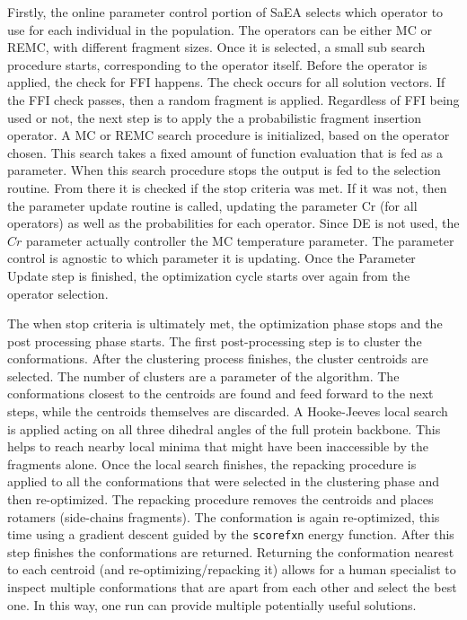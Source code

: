Firstly, the online parameter control portion of \ac{SaEA} selects which
operator to use for each individual in the population.
%
The operators can be either \ac{MC} or \ac{REMC}, with different fragment sizes.
Once it is selected, a small sub search procedure starts, corresponding to the
operator itself.
%
Before the operator is applied, the check for \ac{FFI} happens. The check occurs
for all solution vectors. If the \ac{FFI} check passes, then a random fragment
is applied. Regardless of \ac{FFI} being used or not, the next step is to apply
the a probabilistic fragment insertion operator.
%
A \ac{MC} or \ac{REMC} search procedure is initialized,
based on the operator chosen. This search takes a fixed amount of function
evaluation that is fed as a parameter. When this search procedure stops the
output is fed to the selection routine. From there it is checked if the stop
criteria was met. If it was not, then the parameter update routine is called,
updating the parameter Cr (for all operators) as well as the
probabilities for each operator. Since \ac{DE} is not used, the $Cr$ parameter
actually controller the \ac{MC} temperature parameter. The parameter control is
agnostic to which parameter it is updating. Once the Parameter Update step is
finished, the optimization cycle starts over again from the operator selection.

The when stop criteria is ultimately met, the optimization phase stops and the
post processing phase starts. The first post-processing step is to cluster the
conformations. After the clustering process finishes, the cluster centroids are
selected. The number of clusters are a parameter of the algorithm.
The conformations closest to the centroids are found and feed forward
to the next steps, while the centroids themselves are discarded. A Hooke-Jeeves
local search is applied acting on all three dihedral angles of the full protein
backbone. This helps to reach nearby local minima that might have
been inaccessible by the fragments alone. Once the local search finishes, the
repacking procedure is applied to all the conformations that were selected in
the clustering phase and then re-optimized. The repacking procedure removes the
centroids and places rotamers (side-chains fragments). The conformation is again
re-optimized, this time using a gradient descent guided by the \texttt{scorefxn} energy
function. After this step finishes the conformations are returned. Returning
the conformation nearest to each centroid (and re-optimizing/repacking it) allows
for a human specialist to inspect multiple conformations that are apart from
each other and select the best one. In this way, one run can provide multiple
potentially useful solutions.

